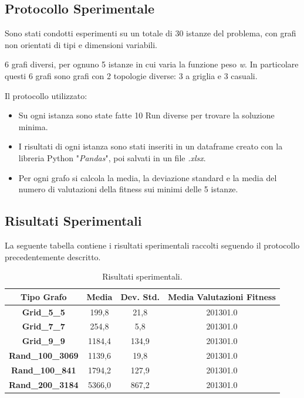 \documentclass[a4paper,12pt]{article}
\begin{document}
\subsection{Protocollo Sperimentale}
Sono stati condotti esperimenti su un totale di 30 istanze del problema, con grafi non orientati di tipi e dimensioni variabili. 

6 grafi diversi, per ognuno 5 istanze in cui varia la funzione peso \textit{w}.
In particolare questi 6 grafi sono grafi con 2 topologie diverse: 3 a griglia e 3 casuali.

Il protocollo utilizzato:
\begin{itemize}
    \item Su ogni istanza sono state fatte 10 Run diverse per trovare la soluzione minima.
    \item I risultati di ogni istanza sono stati inseriti in un dataframe creato con la libreria Python "\textit{Pandas}", poi salvati in un file \textit{.xlsx}.
    \item Per ogni grafo si calcola la media, la deviazione standard e la media del numero di valutazioni della fitness sui minimi delle 5 istanze.
\end{itemize}

\subsection{Risultati Sperimentali}
La seguente tabella contiene i risultati sperimentali raccolti seguendo il protocollo precedentemente descritto.

\begin{table}[H]
\centering
\begin{tabular}{|c|c|c|c|}
\hline
Tipo Grafo & Media & Dev. Std. & Media Valutazioni Fitness \\
\hline
\textbf{Grid\_5\_5} & 199,8 & 21,8 & 201301.0 \\
\textbf{Grid\_7\_7} & 254,8 & 5,8 & 201301.0 \\
\textbf{Grid\_9\_9} & 1184,4 & 134,9 & 201301.0 \\
\textbf{Rand\_100\_3069} & 1139,6 & 19,8 & 201301.0 \\
\textbf{Rand\_100\_841} & 1794,2 & 127,9 & 201301.0 \\
\textbf{Rand\_200\_3184} & 5366,0 & 867,2  & 201301.0 \\
\hline
\end{tabular}
\caption{Risultati sperimentali.}
\end{table}
\end{document}
